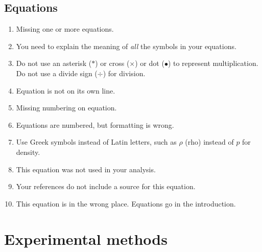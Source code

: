 \documentclass[10pt,letterpaper]{article}
\begin{document}
\begin{multicols}{2}
\subsection*{Equations}

\begin{enumerate}[start=30]
  \item Missing one or more equations.
  \item You need to explain the meaning of \emph{all} the symbols in your equations.
  \item Do not use an asterisk ($*$) or cross ($\times$) or dot ($\bullet$)
    to represent multiplication.
    Do not use a divide sign ($\div$) for division.
  \item Equation is not on its own line.
  \item Missing numbering on equation.
  \item Equations are numbered, but formatting is wrong.
  \item Use Greek symbols instead of Latin letters,
    such as $\rho$ (rho) instead of $p$ for density.
  \item This equation was not used in your analysis.
  \item Your references do not include a source for this equation.
  \item This equation is in the wrong place. Equations go in the introduction.
\end{enumerate}

\section{Experimental methods}


\end{multicols}
\end{document}

